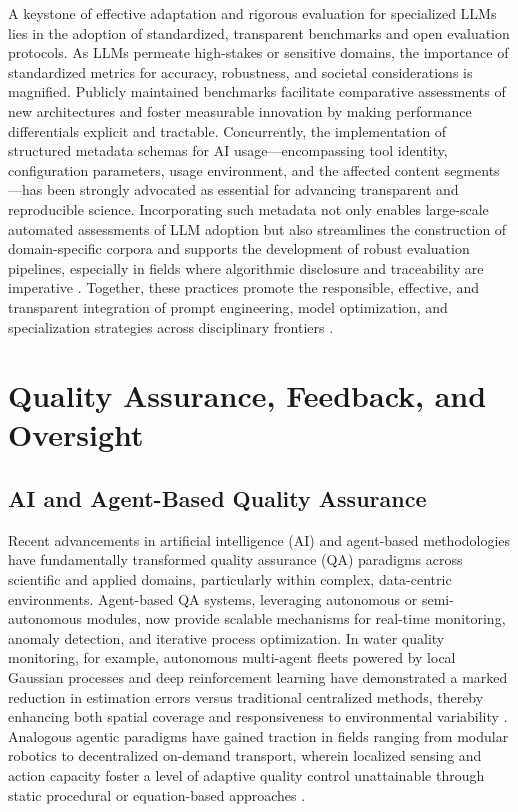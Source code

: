 A keystone of effective adaptation and rigorous evaluation for specialized LLMs lies in the adoption of standardized, transparent benchmarks and open evaluation protocols. As LLMs permeate high-stakes or sensitive domains, the importance of standardized metrics for accuracy, robustness, and societal considerations is magnified. Publicly maintained benchmarks facilitate comparative assessments of new architectures and foster measurable innovation by making performance differentials explicit and tractable. Concurrently, the implementation of structured metadata schemas for AI usage---encompassing tool identity, configuration parameters, usage environment, and the affected content segments---has been strongly advocated as essential for advancing transparent and reproducible science. Incorporating such metadata not only enables large-scale automated assessments of LLM adoption but also streamlines the construction of domain-specific corpora and supports the development of robust evaluation pipelines, especially in fields where algorithmic disclosure and traceability are imperative \cite{ref106}. Together, these practices promote the responsible, effective, and transparent integration of prompt engineering, model optimization, and specialization strategies across disciplinary frontiers \cite{ref104}\cite{ref106}.

\section{Quality Assurance, Feedback, and Oversight}

\subsection{AI and Agent-Based Quality Assurance}

Recent advancements in artificial intelligence (AI) and agent-based methodologies have fundamentally transformed quality assurance (QA) paradigms across scientific and applied domains, particularly within complex, data-centric environments. Agent-based QA systems, leveraging autonomous or semi-autonomous modules, now provide scalable mechanisms for real-time monitoring, anomaly detection, and iterative process optimization. In water quality monitoring, for example, autonomous multi-agent fleets powered by local Gaussian processes and deep reinforcement learning have demonstrated a marked reduction in estimation errors versus traditional centralized methods, thereby enhancing both spatial coverage and responsiveness to environmental variability \cite{ref92}. Analogous agentic paradigms have gained traction in fields ranging from modular robotics to decentralized on-demand transport, wherein localized sensing and action capacity foster a level of adaptive quality control unattainable through static procedural or equation-based approaches \cite{ref93}\cite{ref97}\cite{ref98}\cite{ref115}.

